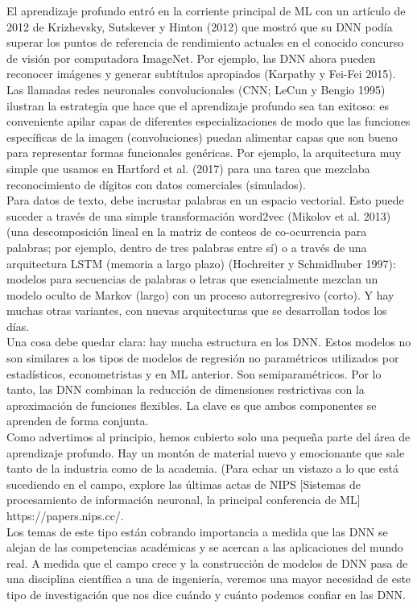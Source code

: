 El aprendizaje profundo entró en la corriente principal de ML con un artículo de 2012 de Krizhevsky, Sutskever y Hinton (2012) que mostró que su DNN podía superar los puntos de referencia de rendimiento actuales en el conocido concurso de visión por computadora ImageNet. Por ejemplo, las DNN ahora pueden reconocer imágenes y generar subtítulos apropiados (Karpathy y Fei-Fei 2015).\\
Las llamadas redes neuronales convolucionales (CNN; LeCun y Bengio 1995) ilustran la estrategia que hace que el aprendizaje profundo sea tan exitoso: es conveniente apilar capas de diferentes especializaciones de modo que las funciones específicas de la imagen (convoluciones) puedan alimentar capas que son bueno para representar formas funcionales genéricas. Por ejemplo, la arquitectura muy simple que usamos en Hartford et al. (2017) para una tarea que mezclaba reconocimiento de dígitos con datos comerciales (simulados).\\
Para datos de texto, debe incrustar palabras en un espacio vectorial. Esto puede suceder a través de una simple transformación word2vec (Mikolov et al. 2013) (una descomposición lineal en la matriz de conteos de co-ocurrencia para palabras; por ejemplo, dentro de tres palabras entre sí) o a través de una arquitectura LSTM (memoria a largo plazo) (Hochreiter y Schmidhuber 1997): modelos para secuencias de palabras o letras que esencialmente mezclan un modelo oculto de Markov (largo) con un proceso autorregresivo (corto). Y hay muchas otras variantes, con nuevas arquitecturas que se desarrollan todos los días.\\
Una cosa debe quedar clara: hay mucha estructura en los DNN. Estos modelos no son similares a los tipos de modelos de regresión no paramétricos utilizados por estadísticos, econometristas y en ML anterior. Son semiparamétricos. Por lo tanto, las DNN combinan la reducción de dimensiones restrictivas con la aproximación de funciones flexibles. La clave es que ambos componentes se aprenden de forma conjunta.\\
Como advertimos al principio, hemos cubierto solo una pequeña parte del área de aprendizaje profundo. Hay un montón de material nuevo y emocionante que sale tanto de la industria como de la academia. (Para echar un vistazo a lo que está sucediendo en el campo, explore las últimas actas de NIPS [Sistemas de procesamiento de información neuronal, la principal conferencia de ML] https://papers.nips.cc/.\\
Los temas de este tipo están cobrando importancia a medida que las DNN se alejan de las competencias académicas y se acercan a las aplicaciones del mundo real. A medida que el campo crece y la construcción de modelos de DNN pasa de una disciplina científica a una de ingeniería, veremos una mayor necesidad de este tipo de investigación que nos dice cuándo y cuánto podemos confiar en las DNN.


